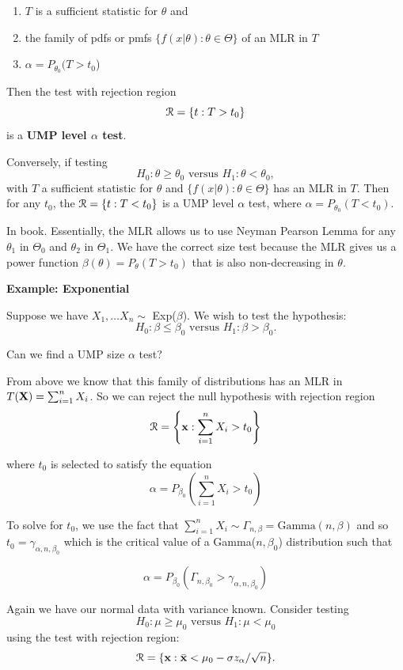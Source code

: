 \documentclass[11pt,]{article}
\def\bx{{\bf x}}
\def\bX{{\bf X}}
\def\bxbar{\bar{ \bx}}
\def\Rsc{{\cal R}}
\def\sumin{\sum_{i=1}^n}
\def\bxbar{\bar{\bx}}
\begin{document}
\begin{enumerate}
\item $T$ is a sufficient statistic for $\theta$ and
\item the family of pdfs or pmfs $\{f(x|\theta): \theta \in \Theta\}$ of an MLR in $T$
\item $\alpha = P_{\theta_0} (T >t_0$)
\end{enumerate}

\noindent Then the test with rejection region \[\Rsc = \{t: T> t_0\}\]
is a \textbf{UMP level \(\alpha\) test}.

Conversely, if testing
\[H_0: \theta \geq \theta_0 \mbox{ versus } H_1: \theta < \theta_0,\]
with \(T\) a sufficient statistic for \(\theta\) and
\(\{f(x|\theta): \theta \in \Theta\}\) has an MLR in \(T\). Then for any
\(t_0\), the \(\Rsc = \{t: T< t_0\}\) is a UMP level \(\alpha\) test,
where \(\alpha = P_{\theta_0} (T < t_0)\).

 In book. Essentially, the MLR allows us to use
Neyman Pearson Lemma for any \(\theta_1\) in \(\Theta_0\) and
\(\theta_2\) in \(\Theta_1\). We have the correct size test because the
MLR gives us a power function \(\beta(\theta) = P_\theta(T>t_0)\) that
is also non-decreasing in \(\theta\).

\textbf{Example: Exponential}

Suppose we have \(X_1, \ldots X_n \sim\) Exp(\(\beta\)). We wish to test
the hypothesis:
\[H_0: \beta \leq \beta_0 \mbox{ versus } H_1: \beta > \beta_0.\]

Can we find a UMP size \(\alpha\) test?

From above we know that this family of distributions has an MLR in
\(T(\bX) = \sumin X_i\). So we can reject the null hypothesis with
rejection region \[\Rsc = \left\{\bx: \sumin X_i > t_0\right\}\]

where \(t_0\) is selected to satisfy the equation
\[\alpha = P_{\beta_0}\left(\sumin X_i > t_0\right)\]

To solve for \(t_0\), we use the fact that
\(\sumin X_i \sim \Gamma_{n, \beta} = \mbox{Gamma}(n,\beta)\) and so
\(t_0 = \gamma_{\alpha, n, \beta_0}\) which is the critical value of a
Gamma(\(n, \beta_0\)) distribution such that

\[\alpha = P_{\beta_0}\left(\Gamma_{n, \beta_0} > \gamma_{\alpha, n, \beta_0}\right)\]


Again we have our normal data with variance known. Consider testing
\[H_0: \mu \geq \mu_0 \mbox{ versus } H_1: \mu < \mu_0\] using the test
with rejection region:
\[\Rsc = \{\bx: \bxbar < \mu_0 - \sigma z_\alpha/\sqrt{n}\}.\]
\end{document}
